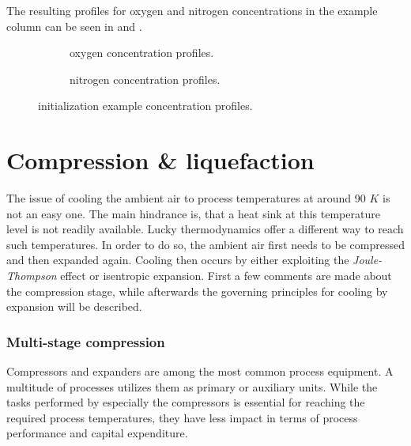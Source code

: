 
        The resulting profiles for oxygen and nitrogen concentrations in the example column can be seen
        in  and .

        \begin{figure}
            \scriptsize
            \hspace{0.01\textwidth}
            \begin{subfigure}{0.45\textwidth}
                
                \caption{oxygen concentration profiles.}
                \label{fig:lpc_example_o2}
            \end{subfigure}
            \hfill
            \begin{subfigure}{0.45\textwidth}
                
                \caption{nitrogen concentration profiles.}
                \label{fig:lpc_example_n2}
            \end{subfigure}
            \hspace{0.01\textwidth}
            \caption{initialization example concentration profiles.}
        \end{figure}

\section{Compression \& liquefaction}
\label{sec:comp_liq}
    The issue of cooling the ambient air to process temperatures at around 90 $K$ is not an easy
    one. The main hindrance is, that a heat sink at this temperature level is not readily available.
    Lucky thermodynamics offer a different way to reach such temperatures. In order to do so,
    the ambient air first needs to be compressed and then expanded again. Cooling then occurs
    by either exploiting the \emph{Joule-Thompson} effect or isentropic expansion. First a few
    comments are made about the compression stage, while afterwards the governing principles
    for cooling by expansion will be described.

    \subsubsection{Multi-stage compression}
        Compressors and expanders are among the most common process equipment. A multitude of processes
        utilizes them as primary or auxiliary units. While the tasks performed by especially the compressors
        is essential for reaching the required process temperatures, they have less impact in terms of
        process performance and capital expenditure.

